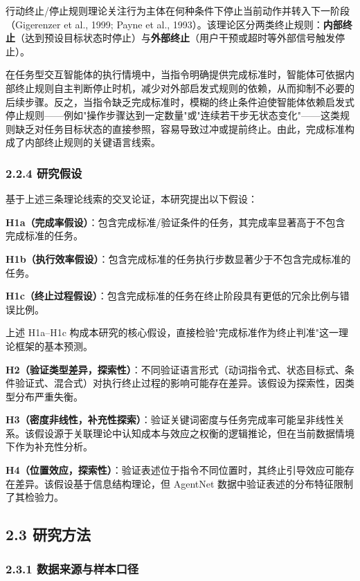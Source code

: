 \documentclass[12pt,a4paper,openany,oneside]{ctexrep}
\begin{document}
行动终止/停止规则理论关注行为主体在何种条件下停止当前动作并转入下一阶段（Gigerenzer et al., 1999; Payne et al., 1993）。该理论区分两类终止规则：\textbf{内部终止}（达到预设目标状态时停止）与\textbf{外部终止}（用户干预或超时等外部信号触发停止）。

在任务型交互智能体的执行情境中，当指令明确提供完成标准时，智能体可依据内部终止规则自主判断停止时机，减少对外部启发式规则的依赖，从而抑制不必要的后续步骤。反之，当指令缺乏完成标准时，模糊的终止条件迫使智能体依赖启发式停止规则——例如"操作步骤达到一定数量"或"连续若干步无状态变化"——这类规则缺乏对任务目标状态的直接参照，容易导致过冲或提前终止。由此，完成标准构成了内部终止规则的关键语言线索。

\subsubsection{2.2.4 研究假设}


基于上述三条理论线索的交叉论证，本研究提出以下假设：

\textbf{H1a（完成率假设）}：包含完成标准/验证条件的任务，其完成率显著高于不包含完成标准的任务。

\textbf{H1b（执行效率假设）}：包含完成标准的任务执行步数显著少于不包含完成标准的任务。

\textbf{H1c（终止过程假设）}：包含完成标准的任务在终止阶段具有更低的冗余比例与错误比例。

上述 H1a–H1c 构成本研究的核心假设，直接检验"完成标准作为终止判准"这一理论框架的基本预测。

\textbf{H2（验证类型差异，探索性）}：不同验证语言形式（动词指令式、状态目标式、条件验证式、混合式）对执行终止过程的影响可能存在差异。该假设为探索性，因类型分布严重失衡。

\textbf{H3（密度非线性，补充性探索）}：验证关键词密度与任务完成率可能呈非线性关系。该假设源于关联理论中认知成本与效应之权衡的逻辑推论，但在当前数据情境下作为补充性分析。

\textbf{H4（位置效应，探索性）}：验证表述位于指令不同位置时，其终止引导效应可能存在差异。该假设基于信息结构理论，但 AgentNet 数据中验证表述的分布特征限制了其检验力。

\subsection{2.3 研究方法}


\subsubsection{2.3.1 数据来源与样本口径}
\end{document}
